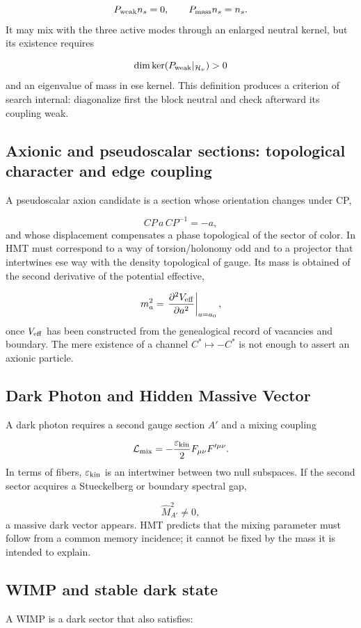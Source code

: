 \[
 P_{\rm weak}n_s=0,\qquad
 P_{\rm mass}n_s=n_s.
\]
It may mix with the three active modes through an enlarged neutral kernel, but its existence requires

\[
 \dim\ker(P_{\rm weak}|_{\mathcal H_\nu})>0
\]
and an eigenvalue of mass in ese kernel. This definition produces a criterion of search internal: diagonalize first the block neutral and check afterward its coupling weak.

\subsection{Axionic and pseudoscalar sections: topological character and edge coupling}
A pseudoscalar axion candidate is a section whose orientation changes under CP,

\[
 CP\,a\,CP^{-1}=-a,
\]
and whose displacement compensates a phase topological of the sector of color. In HMT must correspond to a way of torsion/holonomy odd and to a projector that intertwines ese way with the density topological of gauge. Its mass is obtained of the second derivative of the potential effective,

\[
 m_a^2=
 \left.\frac{\partial^2V_{\rm eff}}{\partial a^2}\right|_{a=a_0},
\]
once \(V_{\rm eff}\) has been constructed from the genealogical record of vacancies and boundary. The mere existence of a channel \(C^*\mapsto-C^*\) is not enough to assert an axionic particle.

\subsection{Dark Photon and Hidden Massive Vector}
A dark photon requires a second gauge section \(A'\) and a mixing coupling

\[
 \mathcal L_{\rm mix}
 =-\frac{\varepsilon_{\rm kin}}2F_{\mu\nu}F'^{\mu\nu}.
\]
In terms of fibers, \(\varepsilon_{\rm kin}\) is an intertwiner between two null subspaces. If the second sector acquires a Stueckelberg or boundary spectral gap,

\[
 \widehat M_{A'}^2\ne0,
\]
a massive dark vector appears. HMT predicts that the mixing parameter must follow from a common memory incidence; it cannot be fixed by the mass it is intended to explain.

\subsection{WIMP and stable dark state}
A WIMP is a dark sector that also satisfies:

